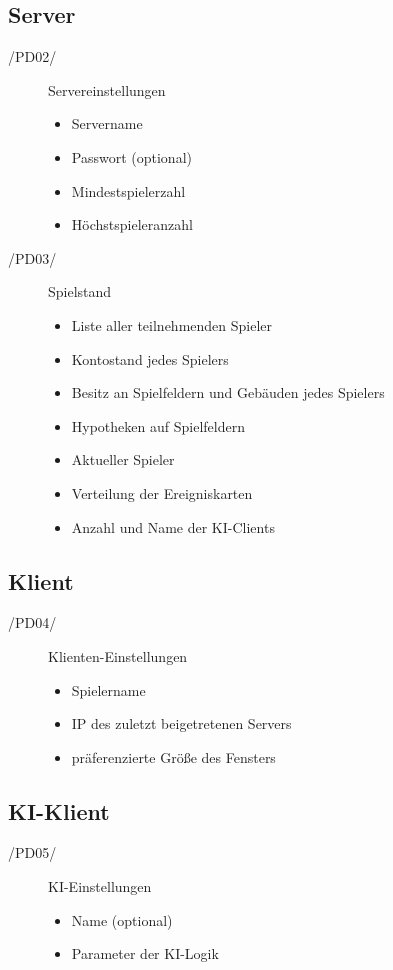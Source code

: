 \documentclass[a4paper,10pt]{article}
\begin{document}
\subsection{Server}
\begin{description}
\item[/PD02/] Servereinstellungen
\begin{itemize}
\item Servername
\item Passwort (optional)
\item Mindestspielerzahl
\item Höchstspieleranzahl
\end{itemize}
\item[/PD03/] Spielstand
\begin{itemize}
\item Liste aller teilnehmenden Spieler
\item Kontostand jedes Spielers
\item Besitz an Spielfeldern und Gebäuden jedes Spielers
\item Hypotheken auf Spielfeldern
\item Aktueller Spieler
\item Verteilung der Ereigniskarten
\item Anzahl und Name der KI-Clients
\end{itemize}
\end{description}

\subsection{Klient}
\begin{description}
\item[/PD04/] Klienten-Einstellungen
\begin{itemize}
\item Spielername
\item IP des zuletzt beigetretenen Servers
\item präferenzierte Größe des Fensters
\end{itemize}
\end{description}

\subsection{KI-Klient}
\begin{description}
\item[/PD05/] KI-Einstellungen
\begin{itemize}
\item Name (optional)
\item Parameter der KI-Logik
\end{itemize}
\end{description}
\end{document}
